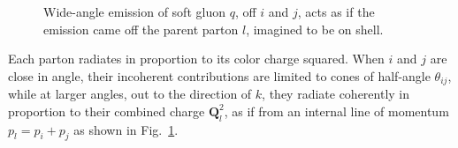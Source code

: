 \begin{figure}[htbp]
	\caption[Coherent soft-gluon emission from two partons close in angle]{Wide-angle emission of soft gluon \(q\), off \(i\) and \(j\), acts as if
		the emission came off the parent parton \(l\), imagined to be on shell.}
	\label{fig:threeParton}
\end{figure}


Each parton radiates in proportion to its color charge squared. When \(i\) and \(j\) are close in angle, their incoherent
contributions are limited to cones of half-angle \(\theta_{ij}\), while at larger
angles, out to the direction of \(k\), they radiate coherently in proportion to
their combined charge \(\mathbf{Q}_l^2\), as if from an internal line of momentum
\(p_l = p_i+p_j\) as shown in Fig.~\ref{fig:threeParton}.

